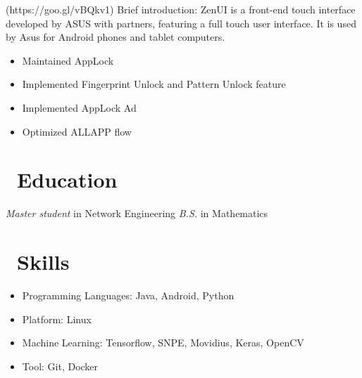 \documentclass{resume}
\begin{document}
 (https://goo.gl/vBQkv1)
Brief introduction: ZenUI is a front-end touch interface developed by ASUS with partners, featuring a full touch user interface. It is used by Asus for Android phones and tablet computers. 
\begin{itemize}
  \item Maintained AppLock
  \item Implemented Fingerprint Unlock and Pattern Unlock feature
  \item Implemented AppLock Ad
  \item Optimized ALLAPP flow
\end{itemize}

\section{\faGraduationCap\ Education}
\textit{Master student} in Network Engineering
\textit{B.S.} in Mathematics


\section{\faCogs\ Skills}
\begin{itemize}[parsep=0.5ex]
  \item Programming Languages: Java, Android, Python
  \item Platform: Linux
  \item Machine Learning: Tensorflow, SNPE, Movidius, Keras, OpenCV
  \item Tool: Git, Docker
\end{itemize}

%
%
\end{document}

